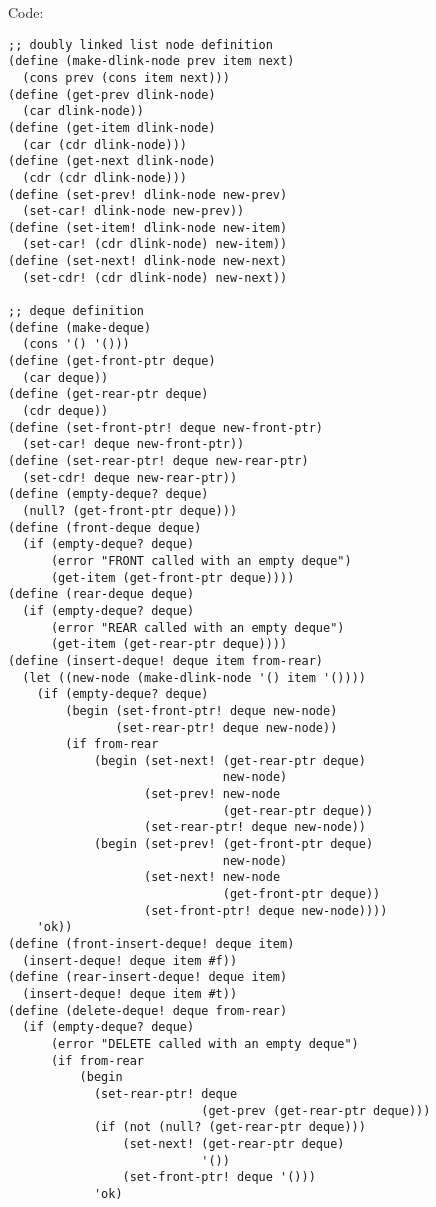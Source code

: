 \documentclass[../main.tex]{subfiles}
\begin{document}
Code:

\begin{lstlisting}
;; doubly linked list node definition
(define (make-dlink-node prev item next)
  (cons prev (cons item next)))
(define (get-prev dlink-node)
  (car dlink-node))
(define (get-item dlink-node)
  (car (cdr dlink-node)))
(define (get-next dlink-node)
  (cdr (cdr dlink-node)))
(define (set-prev! dlink-node new-prev)
  (set-car! dlink-node new-prev))
(define (set-item! dlink-node new-item)
  (set-car! (cdr dlink-node) new-item))
(define (set-next! dlink-node new-next)
  (set-cdr! (cdr dlink-node) new-next))

;; deque definition
(define (make-deque)
  (cons '() '()))
(define (get-front-ptr deque)
  (car deque))
(define (get-rear-ptr deque)
  (cdr deque))
(define (set-front-ptr! deque new-front-ptr)
  (set-car! deque new-front-ptr))
(define (set-rear-ptr! deque new-rear-ptr)
  (set-cdr! deque new-rear-ptr))
(define (empty-deque? deque)
  (null? (get-front-ptr deque)))
(define (front-deque deque)
  (if (empty-deque? deque)
      (error "FRONT called with an empty deque")
      (get-item (get-front-ptr deque))))
(define (rear-deque deque)
  (if (empty-deque? deque)
      (error "REAR called with an empty deque")
      (get-item (get-rear-ptr deque))))
(define (insert-deque! deque item from-rear)
  (let ((new-node (make-dlink-node '() item '())))
    (if (empty-deque? deque)
        (begin (set-front-ptr! deque new-node)
               (set-rear-ptr! deque new-node))
        (if from-rear
            (begin (set-next! (get-rear-ptr deque)
                              new-node)
                   (set-prev! new-node
                              (get-rear-ptr deque))
                   (set-rear-ptr! deque new-node))
            (begin (set-prev! (get-front-ptr deque)
                              new-node)
                   (set-next! new-node
                              (get-front-ptr deque))
                   (set-front-ptr! deque new-node))))
    'ok))
(define (front-insert-deque! deque item)
  (insert-deque! deque item #f))
(define (rear-insert-deque! deque item)
  (insert-deque! deque item #t))
(define (delete-deque! deque from-rear)
  (if (empty-deque? deque)
      (error "DELETE called with an empty deque")
      (if from-rear
          (begin
            (set-rear-ptr! deque
                           (get-prev (get-rear-ptr deque)))
            (if (not (null? (get-rear-ptr deque)))
                (set-next! (get-rear-ptr deque)
                           '())
                (set-front-ptr! deque '()))
            'ok)

\end{lstlisting}
\end{document}

